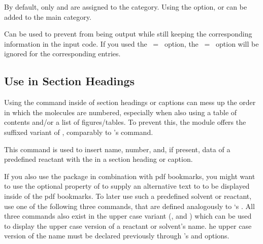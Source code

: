 \documentclass{chemmacros-manual}
\begin{document}
\begin{options}
  By default, only  and  are assigned to the  category. Using 
  the  option,   or  can be added to the main 
  category. 
\end{options}
  
\begin{example}
  \par
  \par
\end{example}

\begin{options}
  Can be used to prevent  from being output while still keeping the corresponding 
  information in the input code. If you used the ~=~ option, the 
  ~=~ option will be ignored for the corresponding entries.
\end{options}

\subsection{Use in Section Headings}\label{sec:reactants-in-headings}

Using the  command inside of section headings or captions can mess up the 
order in which the molecules are numbered, especially when also using a table of contents 
and/or a list of figures/tables. To prevent this, the  module offers
the \code{+} suffixed variant of , comparably to 's  
command.

\begin{commands}
  This command is used to insert name, number, and, if present, data of a predefined 
  reactant with the  in a section heading or caption.
\end{commands}

If you also use the  package in combination with \ac{pdf} bookmarks, you might 
want to use the optional  property of  to supply 
an alternative text to  to be displayed inside of the \ac{pdf} bookmarks. To later 
use such a predefined solvent or reactant, use one of the following three commands, that are 
defined analogously to `s . All three commands also exist in the upper case 
variant (,  and ) which can be used to display
the upper case version of a reactant or solvent's name. he upper case version of the name must be declared 
previously through 's  and  options.
\end{document}

